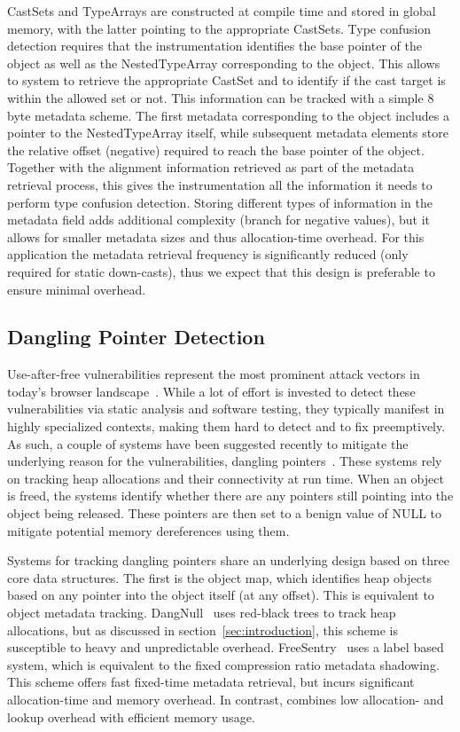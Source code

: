CastSets and TypeArrays are constructed at compile time and stored in global memory, with
the latter pointing to the appropriate CastSets. Type confusion detection requires that
the instrumentation identifies the base pointer of the object as well as the NestedTypeArray corresponding
to the object. This allows to system to retrieve the appropriate CastSet and to identify if the cast target
is within the allowed set or not. This information can be tracked with a simple 8 byte metadata scheme.
The first metadata corresponding to the object includes a pointer to the NestedTypeArray itself, while subsequent
metadata elements store the relative offset (negative) required to reach the base pointer of the object.
Together with the alignment information retrieved as part of the metadata retrieval process, this gives the
instrumentation all the information it needs to perform type confusion detection. Storing different types of
information in the metadata field adds additional complexity (branch for negative values), but it allows
for smaller metadata sizes and thus allocation-time overhead. For this application the 
metadata retrieval frequency is significantly reduced (only required for static down-casts),
thus we expect that this design is preferable to ensure minimal overhead.

\subsection{Dangling Pointer Detection}

Use-after-free vulnerabilities represent the most prominent attack vectors in today's browser landscape~\cite{lee2015preventing}.
While a lot of effort is invested to detect these vulnerabilities via static analysis and software testing,
they typically manifest in highly specialized contexts, making them hard to detect and to fix preemptively.
As such, a couple of systems have been suggested recently to mitigate the underlying reason for the vulnerabilities,
dangling pointers~\cite{lee2015preventing,younan2015freesentry}. These systems rely on tracking heap allocations and
their connectivity at run time. When an object is freed, the systems identify whether there are any pointers
still pointing into the object being released. These pointers are then set to a benign value of NULL to mitigate
potential memory dereferences using them.

Systems for tracking dangling pointers share an underlying design based on three core
data structures. The first is the object map, which identifies heap objects based on any pointer
into the object itself (at any offset). This is equivalent to object metadata tracking.
DangNull~\cite{lee2015preventing} uses red-black trees to track heap allocations, but as discussed
in section~\ref{sec:introduction}, this scheme is susceptible to heavy and unpredictable overhead.
FreeSentry~\cite{younan2015freesentry} uses a label based system, which is equivalent to the fixed
compression ratio metadata shadowing. This scheme offers
fast fixed-time metadata retrieval, but incurs significant allocation-time and memory overhead. In contrast,
\projectname{} combines low allocation- and  lookup overhead with efficient memory usage.

